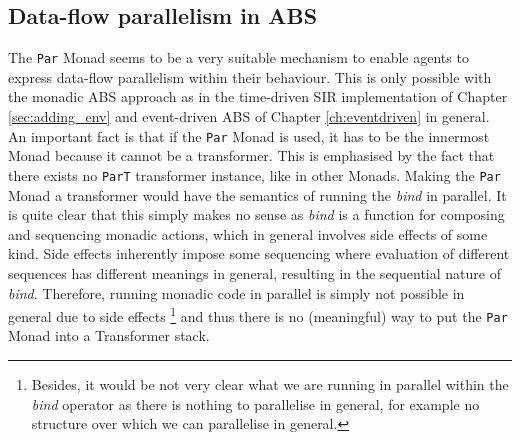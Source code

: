 \subsection{Data-flow parallelism in ABS}
The \texttt{Par} Monad seems to be a very suitable mechanism to enable agents to express data-flow parallelism within their behaviour. This is only possible with the monadic ABS approach as in the time-driven SIR implementation of Chapter \ref{sec:adding_env} and event-driven ABS of Chapter \ref{ch:eventdriven} in general. An important fact is that if the \texttt{Par} Monad is used, it has to be the innermost Monad because it cannot be a transformer. This is emphasised by the fact that there exists no \texttt{ParT} transformer instance, like in other Monads. Making the \texttt{Par} Monad a transformer would have the semantics of running the \textit{bind} in parallel. It is quite clear that this simply makes no sense as \textit{bind} is a function for composing and sequencing monadic actions, which in general involves side effects of some kind. Side effects inherently impose some sequencing where evaluation of different sequences has different meanings in general, resulting in the sequential nature of \textit{bind}. Therefore, running monadic code in parallel is simply not possible in general due to side effects \footnote{Besides, it would be not very clear what we are running in parallel within the \textit{bind} operator as there is nothing to parallelise in general, for example no structure over which we can parallelise in general.} and thus there is no (meaningful) way to put the \texttt{Par} Monad into a Transformer stack.
